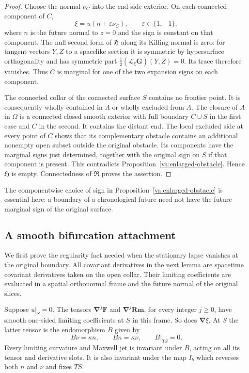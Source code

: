 \begin{proof}
Choose the normal $\nu_C$ into the end-side exterior.  On each connected
component of $C$,
\[
 \xi=u(n+\varepsilon\nu_C),\qquad \varepsilon\in\{1,-1\},
\]
where $n$ is the future normal to $z=0$ and the sign is constant on that
component.  The null second form of $\mathfrak H$ along its Killing
normal is zero: for tangent vectors $Y,Z$ to a spacelike section it is
symmetric by hypersurface orthogonality and has symmetric part
$\tfrac12(\mathcal L_\xi\mathbf G)(Y,Z)=0$.  Its trace therefore
vanishes.  Thus $C$ is marginal for one of the two expansion signs on
each component.

The connected collar of the connected surface $S$ contains no frontier
point.  It is consequently wholly contained in $A$ or wholly excluded
from $A$.  The closure of $A$ in $\Omega$ is a connected closed smooth
exterior with full boundary $C\cup S$ in the first case and $C$ in
the second.  It contains the distant end.  The local excluded side at
every point of $C$ shows that its complementary obstacle contains an
additional nonempty open subset outside the original obstacle.  Its
components have the marginal signs just determined, together with the
original sign on $S$ if that component is present.  This contradicts
Proposition~\ref{va:enlarged-obstacle}.  Hence $\mathfrak H$ is empty.
Connectedness of $\mathfrak R$ proves the assertion.
\end{proof}

The componentwise choice of sign in
Proposition~\ref{va:enlarged-obstacle} is essential here: a boundary of
a chronological future need not have the future marginal sign of the
original surface.

\subsection{A smooth bifurcation attachment}

We first prove the regularity fact needed when the stationary lapse
vanishes at the original boundary.  All covariant derivatives in the
next lemma are spacetime covariant derivatives taken on the open
collar.  Their limiting coefficients are evaluated in a spatial
orthonormal frame and the future normal of the original slices.

\begin{lemma}\label{st:covariant-jets}
Suppose $u|_S=0$.  The tensors
$\boldsymbol\nabla^j\mathbf F$ and
$\boldsymbol\nabla^j\mathbf{Rm}$, for every integer $j\geq0$, have
smooth one-sided limiting coefficients at $S$ in this frame.  So does
$\boldsymbol\nabla\xi$.  At $S$ the latter tensor is the endomorphism
$B$ given by
\begin{equation}\label{st:boost-generator}
 B\nu=\kappa n,\qquad Bn=\kappa\nu,
 \qquad B|_{TS}=0.
\end{equation}
Every limiting curvature and Maxwell jet is invariant under $B$, acting
on all its tensor and derivative slots.  It is also invariant under
the map $I_b$ which reverses both $n$ and $\nu$ and fixes $TS$.
\end{lemma}

